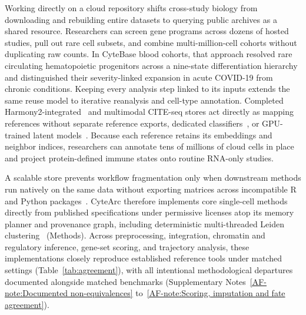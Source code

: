 \documentclass[11pt]{article}
\newcommand{\sref}[1]{\ref*{AF-#1}}
\begin{document}
Working directly on a cloud repository shifts cross-study biology from downloading and rebuilding entire datasets to querying public archives as a shared resource. Researchers can screen gene programs across dozens of hosted studies, pull out rare cell subsets, and combine multi-million-cell cohorts without duplicating raw counts. In CyteBase blood cohorts, that approach resolved rare circulating hematopoietic progenitors across a nine-state differentiation hierarchy and distinguished their severity-linked expansion in acute COVID-19 from chronic conditions. Keeping every analysis step linked to its inputs extends the same reuse model to iterative reanalysis and cell-type annotation. Completed Harmony2-integrated~\cite{korsunsky2019,patikas2026integration} and multimodal CITE-seq stores act directly as mapping references without separate reference exports, dedicated classifiers~\cite{dominguez2022}, or GPU-trained latent models~\cite{scvihub2025,lotfollahi2026archmap}. Because each reference retains its embeddings and neighbor indices, researchers can annotate tens of millions of cloud cells in place and project protein-defined immune states onto routine RNA-only studies.

A scalable store prevents workflow fragmentation only when downstream methods run natively on the same data without exporting matrices across incompatible R and Python packages~\cite{zappia2021over,wang2026benchmarking}. CyteArc therefore implements core single-cell methods directly from published specifications under permissive licenses atop its memory planner and provenance graph, including deterministic multi-threaded Leiden clustering~\cite{traag2019,sahu2023gveleiden} (Methods). Across preprocessing, integration, chromatin and regulatory inference, gene-set scoring, and trajectory analysis, these implementations closely reproduce established reference tools under matched settings (Table~\ref{tab:agreement}), with all intentional methodological departures documented alongside matched benchmarks (Supplementary Notes~\sref{note:Documented non-equivalences} to~\sref{note:Scoring, imputation and fate agreement}).

\begin{table}[p]
  \centering
  \caption{
    \textbf{Numerical agreement with reference implementations and direct computations under matched inputs and settings.}
    Protocols, software versions, and the four tolerances set in advance are detailed in Methods and Supplementary Notes~\sref{note:Documented non-equivalences} to~\sref{note:Scoring, imputation and fate agreement}.
    $|\Delta|$, absolute difference; ARI, adjusted Rand index; AUROC, area under the receiver operating characteristic curve; PCs, principal components; $r$, Pearson correlation; $\rho$, Spearman correlation.
  }
  \label{tab:agreement}
  \footnotesize
  
\end{table}
\end{document}
